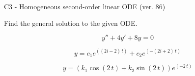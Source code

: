 \begin{exercise}
  \begin{exerciseTitle}C3 - Homogeneous second-order linear ODE (ver. 86)\end{exerciseTitle}
  \begin{exerciseStatement}
    
Find the general solution to the given ODE.

    
\[y''+4y'+8y = 0\]

  \end{exerciseStatement}
  \begin{exerciseAnswer}
    
\[y= c_{1} e^{\left(\left(2 i - 2\right) \, t\right)} + c_{2} e^{\left(-\left(2 i + 2\right) \, t\right)}\]

    
\[y= {\left(k_{1} \cos\left(2 \, t\right) + k_{2} \sin\left(2 \, t\right)\right)} e^{\left(-2 \, t\right)}\]

  \end{exerciseAnswer}
\end{exercise}